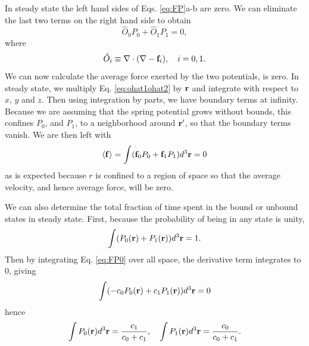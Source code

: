 \documentclass[journal = mamobx, manuscript = article]{achemso}
\def\br{{\bf r}}
\def\bof{{\bf f}}
\def\Ohat{\hat O}
\begin{document}
In steady state the left hand sides of Eqs. \ref{eq:FP}a-b are zero. We can
eliminate the last two terms on the right hand side to obtain
\begin{equation}
\label{eq:ohat1ohat2}
\Ohat_0 P_0 + \Ohat_1 P_1 = 0,
\end{equation}
where 
\begin{equation}
\label{eq:Ohatdefn}
\Ohat_i \equiv \nabla \cdot (\nabla - \bof_i), ~~~ i=0,1.
\end{equation}
We can now calculate the average force exerted by the two potentials, is zero. In steady
state, we multiply Eq. \ref{eq:ohat1ohat2} by $\br$ and integrate with respect to $x$, $y$
and $z$. Then using integration by parts, we have boundary terms at infinity.
Because we are assuming that the spring potential grows without bounds, this
confines $P_0$, and $P_1$, to a neighborhood around $\br'$, so that the boundary
terms vanish. We are then left with
\begin{equation}
\label{eq:P0plusP1}
\langle \bof\rangle = \int (\bof_0 P_0 + \bof_1 P_1) d^3\br = 0
\end{equation}
as is expected because $r$ is confined to a region of space so that the average
velocity, and hence average force, will be zero. 

We can also determine the total fraction of time spent in the bound or unbound
states in steady state. First, because the probability of being in any state is unity,
\begin{equation}
\int (P_0(\br) + P_1(\br)) d^3\br = 1 .
\end{equation}
Then by integrating Eq. \ref{eq:FP0} over all space, the derivative term
integrates to 0, giving
\begin{equation}
\int (-c_0 P_0(\br) + c_1 P_1(\br)) d^3\br = 0
\end{equation}
hence
\begin{equation}
\label{eq:norms}
\int P_0(\br) d^3\br = \frac{c_1}{c_0+c_1}, ~~~
\int P_1(\br) d^3\br = \frac{c_0}{c_0+c_1} .
\end{equation}
\end{document}
